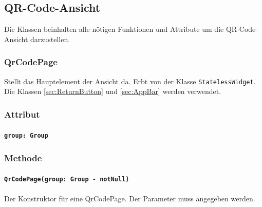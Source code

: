 \documentclass[parskip=full]{scrartcl}
\begin{document}
        \newpage

\subsection{QR-Code-Ansicht}
    Die Klassen beinhalten alle nötigen Funktionen und Attribute um die QR-Code-Ansicht darzustellen.

    \subsubsection{QrCodePage}
    Stellt das Hauptelement der Ansicht da. Erbt von der Klasse \texttt{StatelessWidget}. Die Klassen \ref{sec:ReturnButton} und \ref{sec:AppBar} werden verwendet.
        \subsubsection*{Attribut}
            \paragraph*{\texttt{group: Group}}

        \subsubsection*{Methode}
            \paragraph*{\texttt{QrCodePage(group: Group - notNull)}} Der Konstruktor für eine QrCodePage. Der Parameter muss angegeben werden.
\end{document}

